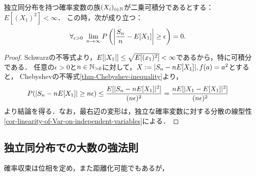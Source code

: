 \documentclass[uplatex,dvipdfmx]{jsreport}
\begin{document}
\begin{theorem}\label{thm-weak-law-of-large-numbers}
    独立同分布を持つ確率変数の族$(X_i)_{i\in\mathbb{N}}$が二乗可積分であるとする：$E[(X_1)^2]<\infty$．
    この時，次が成り立つ：
    \[\forall_{\epsilon>0}\;\lim_{n\to\infty}P\left(\left|\frac{S_n}{n}-E[X_1]\right|\ge\epsilon\right)=0.\]
\end{theorem}
\begin{proof}
    Schwarzの不等式より，$E[\lvert X_1\rvert]\le\sqrt{E[(x_1)^2]}<\infty$であるから，特に可積分である．
    任意の$\epsilon>0$と$n\in\mathbb{N}_{>0}$に対して，$X:=\lvert S_n-nE[X_1]\rvert,f(a)=a^2$とすると，
    Chebyshevの不等式\ref{thm-Chebyshev-inequality}より，
    \[P(\lvert S_n-nE[X_1]\rvert\ge n\epsilon)\le\frac{E[\lvert S_n-nE[X_1]\rvert^2]}{(n\epsilon)^2}=\frac{nE[\lvert X_1-E[X_1]\rvert^2]}{(n\epsilon)^2}\]
    より結論を得る．なお，最右辺の変形は，独立な確率変数に対する分散の線型性\ref{cor-linearity-of-Var-on-independent-variables}による．
\end{proof}

\subsection{独立同分布での大数の強法則}

\begin{tcolorbox}[colframe=ForestGreen, colback=ForestGreen!10!white,breakable,colbacktitle=ForestGreen!40!white,coltitle=black,fonttitle=\bfseries\sffamily,
title=]
    確率収束は位相を定め，また距離化可能でもあるが，
\end{tcolorbox}
\end{document}
